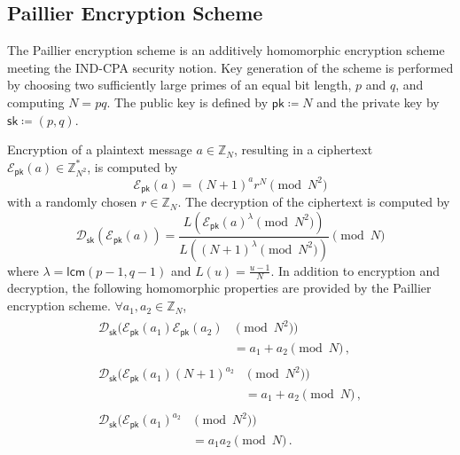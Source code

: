 \documentclass[letterpaper, 10 pt, conference]{ieeeconf}
\begin{document}
\subsection{Paillier Encryption Scheme}\label{subsec:paillier}
The Paillier encryption scheme \cite{paillierPublicKeyCryptosystemsBased1999,katzIntroductionModernCryptography2008} is an additively homomorphic encryption scheme meeting the IND-CPA security notion. Key generation of the scheme is performed by choosing two sufficiently large primes of an equal bit length, $p$ and $q$, and computing $N=pq$. The public key is defined by $\mathsf{pk} \coloneqq N$ and the private key by $\mathsf{sk} \coloneqq (p,q)$.

Encryption of a plaintext message $a \in \mathbb{Z}_N$, resulting in a ciphertext $\mathcal{E}_\mathsf{pk}(a) \in \mathbb{Z}^*_{N^2}$, is computed by
\begin{equation}
    \mathcal{E}_\mathsf{pk}(a) = (N+1)^a r^N \pmod{N^2}
\end{equation}
with a randomly chosen $r \in \mathbb{Z}_N$. The decryption of the ciphertext is computed by
\begin{equation}
    \mathcal{D}_\mathsf{sk}(\mathcal{E}_\mathsf{pk}(a)) = \frac{L\left(\mathcal{E}_\mathsf{pk}(a)^\lambda \pmod{N^2}\right)}{L\left((N+1)^\lambda \pmod{N^2}\right)}\pmod{N}
\end{equation}
where $\lambda = \mathsf{lcm}(p-1,q-1)$ and $L(u)=\frac{u-1}{N}$. In addition to encryption and decryption, the following homomorphic properties are provided by the Paillier encryption scheme. $\forall a_1,a_2 \in \mathbb{Z}_N$,
\begin{align}
    \begin{split}\label{eqn:paillier_add}
        \mathcal{D}_\mathsf{sk}(\mathcal{E}_\mathsf{pk}(a_1)\mathcal{E}_\mathsf{pk}(a_2) & \pmod{N^2})\\
        &= a_1+a_2 \pmod{N}\,,
    \end{split}\\
    \begin{split}\label{eqn:paillier_add_known}
        \mathcal{D}_\mathsf{sk}(\mathcal{E}_\mathsf{pk}(a_1)(N+1)^{a_2} & \pmod{N^2})\\
        &= a_1+a_2\pmod{N}\,,
    \end{split}\\
    \begin{split}
        \mathcal{D}_\mathsf{sk}(\mathcal{E}_\mathsf{pk}(a_1)^{a_2} & \pmod{N^2})\\
        &= a_1a_2 \pmod{N}\,.
    \end{split}
\end{align}
\end{document}
